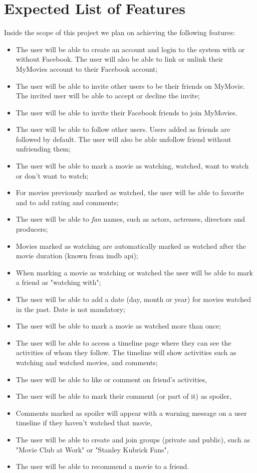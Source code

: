 \section{Expected List of Features}

Inside the scope of this project we plan on achieving the following features:

\begin{itemize}
  \item The user will be able to create an account and login to the system with
    or without Facebook. The user will also be able to link or unlink their
    MyMovies account to their Facebook account;
  \item The user will be able to invite other users to be their friends on
    MyMovie. The invited user will be able to accept or decline the invite;
  \item The user will be able to invite their Facebook friends to join
    MyMovies.
  \item The user will be able to follow other users. Users added as friends are
    followed by default. The user will also be able unfollow friend without
    unfriending them;
  \item The user will be able to mark a movie as watching,
    watched, want to watch or don't want to watch;
  \item For movies previously marked as watched, the user will be able to
    favorite and to add rating and comments;
  \item The user will be able to \textit{fan} names, such as actors, actresses,
    directors and producers;
  \item Movies marked as watching are automatically marked as watched after the
    movie duration (known from imdb api);
  \item When marking a movie as watching or watched the user will be able to
    mark a friend as "watching with";
  \item The user will be able to add a date (day, month or year) for movies
    watched in the past. Date is not mandatory;
  \item The user will be able to mark a movie as watched more than once;
  \item The user will be able to access a timeline page where they can see the
    activities of whom they follow. The timeline will show activities such as
    watching and watched movies, and comments;
  \item The user will be able to like or comment on friend's activities,
  \item The user will be able to mark their comment (or part of it) as spoiler,
  \item Comments marked as spoiler will appear with a warning message on a user
    timeline if they haven't watched that movie,
  \item The user will be able to create and join groups (private and public),
    such as "Movie Club at Work" or "Stanley Kubrick Fans",
  \item The user will be able to recommend a movie to a friend.
\end{itemize}

